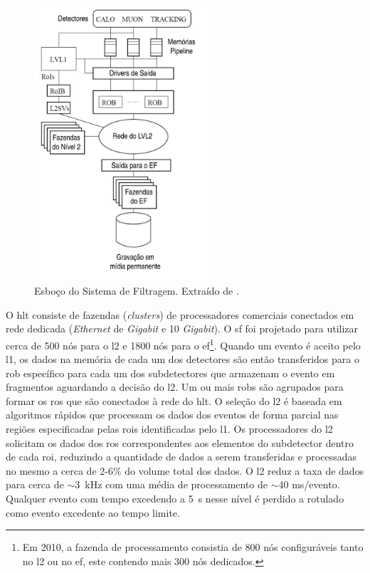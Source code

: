 \begin{figure}[ht!]
\label{fig:sf_esboco}
\centering
\includegraphics[width=0.6\textwidth]{imagens/sf_resumo.pdf}
\caption[Esboço do Sistema de Filtragem.]{Esboço do Sistema de Filtragem. Extraído de \cite{tese_eduardo}.}
\end{figure}

O \gls{hlt} consiste de fazendas (\emph{clusters}) de
processadores comerciais conectados em rede dedicada (\emph{Ethernet} de \emph{Gigabit} 
e 10 \emph{Gigabit}).  O \gls{sf} foi projetado para utilizar cerca de 500 nós para o
\acrshort{l2} e 1800 nós para o \acrshort{ef}\footnote{Em 2010, a fazenda de processamento 
consistia de 800 nós configuráveis tanto no \acrshort{l2} ou no \acrshort{ef}, este 
contendo mais 300 nós dedicados.}. Quando um evento é aceito pelo
\gls{l1}, os dados na memória de cada um dos detectores são então transferidos
para o \gls{rob} específico para cada um dos subdetectores que armazenam o
evento em fragmentos aguardando a decisão do \gls{l2}. Um ou mais \glspl{rob} são
agrupados para formar os \gls{ros} que são conectados à rede do \gls{hlt}. O
seleção do \gls{l2} é baseada em algoritmos rápidos que
processam os dados dos eventos de forma parcial nas regiões especificadas pelas
\glspl{roi} identificadas pelo \gls{l1}. Os processadores do \gls{l2} solicitam os
dados dos \gls{ros} correspondentes aos elementos do subdetector dentro de cada
\gls{roi}, reduzindo a quantidade de dados a serem transferidas e processadas no
mesmo a cerca de 2-6\% do volume total dos dados. O \gls{l2} reduz a taxa de
dados para cerca de $\sim$3~kHz com uma média de processamento de $\sim$40
ms/evento. Qualquer evento com tempo excedendo a 5~s nesse nível é perdido a
rotulado como evento excedente ao tempo limite.   

